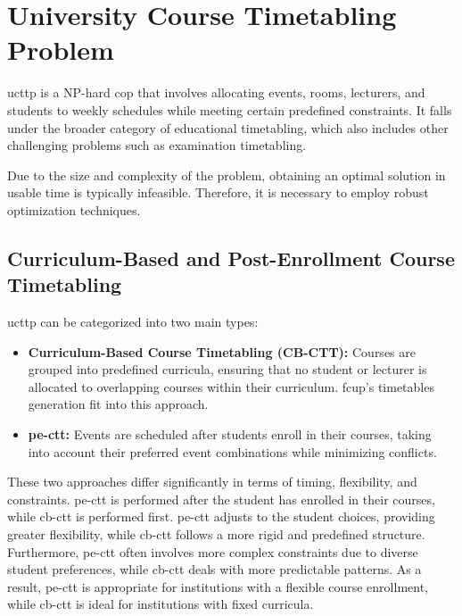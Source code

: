 \section{University Course Timetabling Problem}
\ac{ucttp} is a NP-hard \ac{cop} that involves allocating events, rooms, lecturers, and students to weekly schedules while meeting certain predefined constraints. It falls under the broader category of educational timetabling, which also includes other challenging problems such as examination timetabling. 

Due to the size and complexity of the problem, obtaining an optimal solution in usable time is typically infeasible. Therefore, it is necessary to employ robust optimization techniques.

\subsection{Curriculum-Based and Post-Enrollment Course Timetabling}

\ac{ucttp} can be categorized into two main types:

\begin{itemize}
\item \textbf{Curriculum-Based Course Timetabling (CB-CTT):} Courses are grouped into predefined curricula, ensuring that no student or lecturer is allocated to overlapping courses within their curriculum. \ac{fcup}'s timetables generation fit into this approach.

\item \textbf{\ac{pe-ctt}:} Events are scheduled after students enroll in their courses, taking into account their preferred event combinations while minimizing conflicts.
\end{itemize}

These two approaches differ significantly in terms of timing, flexibility, and constraints. \ac{pe-ctt} is performed after the student has enrolled in their courses, while \ac{cb-ctt} is performed first. \ac{pe-ctt} adjusts to the student choices, providing greater flexibility, while \ac{cb-ctt} follows a more rigid and predefined structure. Furthermore, \ac{pe-ctt} often involves more complex constraints due to diverse student preferences, while \ac{cb-ctt} deals with more predictable patterns. As a result, \ac{pe-ctt} is appropriate for institutions with a flexible course enrollment, while \ac{cb-ctt} is ideal for institutions with fixed curricula.

